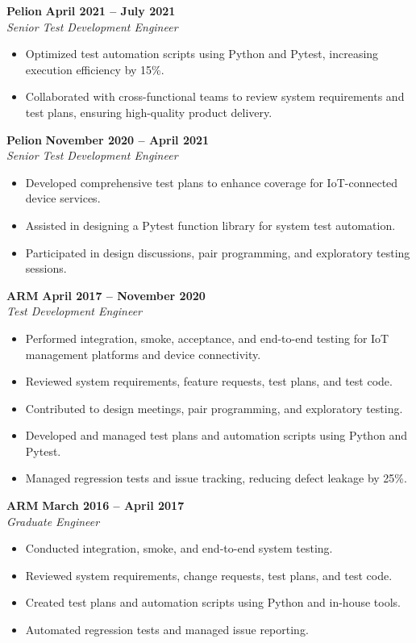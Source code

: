 \documentclass[12pt]{article}
\begin{document}
\textbf{Pelion} \hfill \textbf{April 2021 – July 2021} \\
\textit{Senior Test Development Engineer} \\
\begin{itemize}
    \item Optimized test automation scripts using Python and Pytest, increasing execution efficiency by 15\%.
    \item Collaborated with cross-functional teams to review system requirements and test plans, ensuring high-quality product delivery.
\end{itemize}

\textbf{Pelion} \hfill \textbf{November 2020 – April 2021} \\
\textit{Senior Test Development Engineer} \\
\begin{itemize}
    \item Developed comprehensive test plans to enhance coverage for IoT-connected device services.
    \item Assisted in designing a Pytest function library for system test automation.
    \item Participated in design discussions, pair programming, and exploratory testing sessions.
\end{itemize}

\textbf{ARM} \hfill \textbf{April 2017 – November 2020} \\
\textit{Test Development Engineer} \\
\begin{itemize}
    \item Performed integration, smoke, acceptance, and end-to-end testing for IoT management platforms and device connectivity.
    \item Reviewed system requirements, feature requests, test plans, and test code.
    \item Contributed to design meetings, pair programming, and exploratory testing.
    \item Developed and managed test plans and automation scripts using Python and Pytest.
    \item Managed regression tests and issue tracking, reducing defect leakage by 25\%.
\end{itemize}

\textbf{ARM} \hfill \textbf{March 2016 – April 2017} \\
\textit{Graduate Engineer} \\
\begin{itemize}
    \item Conducted integration, smoke, and end-to-end system testing.
    \item Reviewed system requirements, change requests, test plans, and test code.
    \item Created test plans and automation scripts using Python and in-house tools.
    \item Automated regression tests and managed issue reporting.
\end{itemize}
\end{document}
